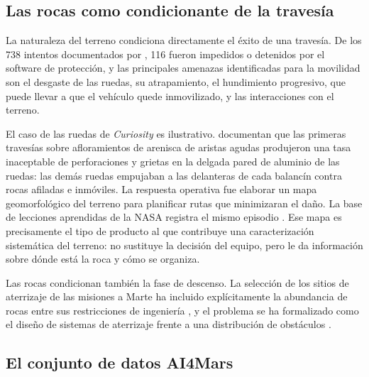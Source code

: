 \subsection{Las rocas como condicionante de la travesía}

La naturaleza del terreno condiciona directamente el éxito de una travesía. De los \num{738}
intentos documentados por \citet{rankin2020mobility}, \num{116} fueron impedidos o detenidos
por el software de protección, y las principales amenazas identificadas para la movilidad son
el desgaste de las ruedas, su atrapamiento, el hundimiento progresivo, que puede llevar a que
el vehículo quede inmovilizado, y las interacciones con el terreno.

El caso de las ruedas de \textit{Curiosity} es ilustrativo. \citet{arvidson2017wheels}
documentan que las primeras travesías sobre afloramientos de arenisca de aristas agudas
produjeron una tasa inaceptable de perforaciones y grietas en la delgada pared de aluminio de
las ruedas: las demás ruedas empujaban a las delanteras de cada balancín contra rocas afiladas
e inmóviles. La respuesta operativa fue elaborar un mapa geomorfológico del terreno para
planificar rutas que minimizaran el daño. La base de lecciones aprendidas de la NASA registra
el mismo episodio \citep{jpl2017wheels}. Ese mapa es precisamente el tipo de
producto al que contribuye una caracterización sistemática del terreno: no sustituye la
decisión del equipo, pero le da información sobre dónde está la roca y cómo se organiza.

Las rocas condicionan también la fase de descenso. La selección de los sitios de aterrizaje
de las misiones a Marte ha incluido explícitamente la abundancia de rocas entre sus
restricciones de ingeniería \citep{golombek2003mer, golombek2012msl}, y el problema se ha
formalizado como el diseño de sistemas de aterrizaje frente a una distribución de obstáculos
\citep{lorenz2023analytic}.

\subsection{El conjunto de datos AI4Mars}
\label{sec:ai4mars}

